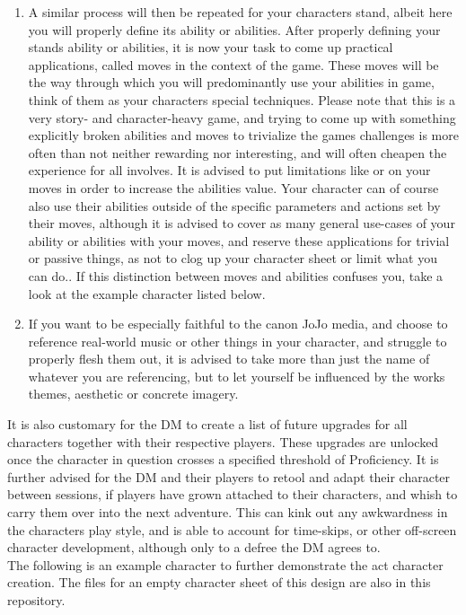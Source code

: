 \documentclass[a4paper,11pt]{article}
\begin{document}
\begin{enumerate}
		\item A similar process will then be repeated for your characters stand, albeit here you will properly define its ability or abilities. After properly defining your stands ability or abilities, it is now your task to come up practical applications, called moves in the context of the game. These moves will be the way through which you will predominantly use your abilities in game, think of them as your characters special techniques. Please note that this is a very story- and character-heavy game, and trying to come up with something explicitly broken abilities and moves to trivialize the games challenges is more often than not neither rewarding nor interesting, and will often cheapen the experience for all involves. It is advised to put limitations like  or  on your moves in order to increase the abilities value. Your character can of course also use their abilities outside of the specific parameters and actions set by their moves, although it is advised to cover as many general use-cases of your ability or abilities with your moves, and reserve these applications for trivial or passive things, as not to clog up your character sheet or limit what you can do.. If this distinction between moves and abilities confuses you, take a look at the example character listed below.
		\item If you want to be especially faithful to the canon JoJo media, and choose to reference real-world music or other things in your character, and struggle to properly flesh them out, it is advised to take more than just the name of whatever you are referencing, but to let yourself be influenced by the works themes, aesthetic or concrete imagery.
		
\end{enumerate}
It is also customary for the  DM to create a list of future upgrades for all characters together with their respective players. These upgrades are unlocked once the character in question crosses a specified threshold of Proficiency. It is further advised for the DM and their players to retool and adapt their character between sessions, if players have grown attached to their characters, and whish to carry them over into the next adventure. This can kink out any awkwardness in the characters play style, and is able to account for time-skips, or other off-screen character development, although only to a defree the DM agrees to.\\
The following is an example character to further demonstrate the act character creation. The files for an empty character sheet of this design are also in this repository.
\end{document}
